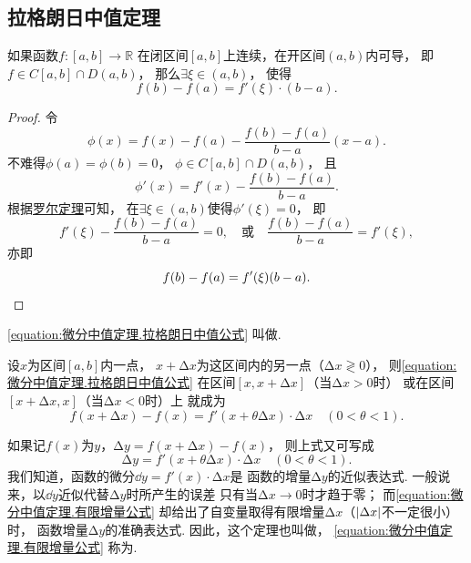 \subsection{拉格朗日中值定理}
\begin{theorem}[拉格朗日中值定理]\label{theorem:微分中值定理.拉格朗日中值定理}
如果函数\(f\colon[a,b]\to\mathbb{R}\)
在闭区间\([a,b]\)上连续，在开区间\((a,b)\)内可导，
即\(f \in C[a,b] \cap D(a,b)\)，
那么\(\exists \xi \in (a,b)\)，
使得\begin{equation}\label{equation:微分中值定理.拉格朗日中值公式}
	f(b) - f(a) = f'(\xi) \cdot (b-a).
\end{equation}
\begin{proof}
令\begin{equation*}
	\phi(x)=f(x)-f(a)-\frac{f(b)-f(a)}{b-a}(x-a).
\end{equation*}
不难得\(\phi(a)=\phi(b)=0\)，
\(\phi\in C[a,b]\cap D(a,b)\)，
且\begin{equation*}
	\phi'(x)=f'(x)-\frac{f(b)-f(a)}{b-a}.
\end{equation*}
根据\hyperref[theorem:微分中值定理.罗尔定理]{罗尔定理}可知，
在\(\exists\xi\in(a,b)\)使得\(\phi'(\xi)=0\)，
即\begin{equation*}
	f'(\xi)-\frac{f(b)-f(a)}{b-a}=0,
	\quad\text{或}\quad
	\frac{f(b)-f(a)}{b-a}=f'(\xi),
\end{equation*}
亦即\begin{equation*}
	f(b)-f(a)=f'(\xi)(b-a).
	\qedhere
\end{equation*}
\end{proof}
\end{theorem}
\cref{equation:微分中值定理.拉格朗日中值公式} 叫做.

设\(x\)为区间\([a,b]\)内一点，
\(x+\increment x\)为这区间内的另一点（\(\increment x \gtrless 0\)），
则\cref{equation:微分中值定理.拉格朗日中值公式}
在区间\([x,x+\increment x]\)（当\(\increment x>0\)时）
或在区间\([x+\increment x,x]\)（当\(\increment x<0\)时）上
就成为\begin{equation}
	f(x+\increment x) - f(x)
	= f'(x+\theta \increment x) \cdot \increment x
	\quad(0<\theta<1).
\end{equation}

如果记\(f(x)\)为\(y\)，\(\increment y = f(x+\increment x) - f(x)\)，
则上式又可写成
\begin{equation}\label{equation:微分中值定理.有限增量公式}
	\increment y = f'(x+\theta \increment x) \cdot \increment x
	\quad(0<\theta<1).
\end{equation}
我们知道，函数的微分\(\dd{y} = f'(x) \cdot \increment x\)是
函数的增量\(\increment y\)的近似表达式.
一般说来，以\(\dd{y}\)近似代替\(\increment y\)时所产生的误差
只有当\(\increment x\to0\)时才趋于零；
而\cref{equation:微分中值定理.有限增量公式}
却给出了自变量取得有限增量\(\increment x\)（\(\abs{\Delta x}\)不一定很小）时，
函数增量\(\increment y\)的准确表达式.
因此，这个定理也叫做，
\cref{equation:微分中值定理.有限增量公式} 称为.

